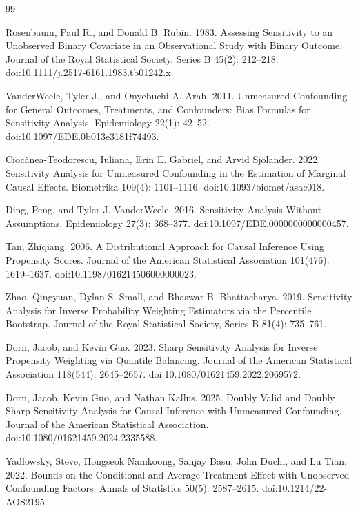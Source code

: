 \documentclass{article}
\begin{document}
\begin{thebibliography}{99}

   Rosenbaum, Paul R., and Donald B. Rubin. 1983. Assessing Sensitivity to an Unobserved Binary Covariate in an Observational Study with Binary Outcome. Journal of the Royal Statistical Society, Series B 45(2): 212--218. doi:10.1111/j.2517-6161.1983.tb01242.x.

   VanderWeele, Tyler J., and Onyebuchi A. Arah. 2011. Unmeasured Confounding for General Outcomes, Treatments, and Confounders: Bias Formulas for Sensitivity Analysis. Epidemiology 22(1): 42--52. doi:10.1097/EDE.0b013e3181f74493.

   Ciocănea-Teodorescu, Iuliana, Erin E. Gabriel, and Arvid Sjölander. 2022. Sensitivity Analysis for Unmeasured Confounding in the Estimation of Marginal Causal Effects. Biometrika 109(4): 1101--1116. doi:10.1093/biomet/asac018.

   Ding, Peng, and Tyler J. VanderWeele. 2016. Sensitivity Analysis Without Assumptions. Epidemiology 27(3): 368--377. doi:10.1097/EDE.0000000000000457.

   Tan, Zhiqiang. 2006. A Distributional Approach for Causal Inference Using Propensity Scores. Journal of the American Statistical Association 101(476): 1619--1637. doi:10.1198/016214506000000023.

   Zhao, Qingyuan, Dylan S. Small, and Bhaswar B. Bhattacharya. 2019. Sensitivity Analysis for Inverse Probability Weighting Estimators via the Percentile Bootstrap. Journal of the Royal Statistical Society, Series B 81(4): 735--761.

   Dorn, Jacob, and Kevin Guo. 2023. Sharp Sensitivity Analysis for Inverse Propensity Weighting via Quantile Balancing. Journal of the American Statistical Association 118(544): 2645--2657. doi:10.1080/01621459.2022.2069572.

   Dorn, Jacob, Kevin Guo, and Nathan Kallus. 2025. Doubly Valid and Doubly Sharp Sensitivity Analysis for Causal Inference with Unmeasured Confounding. Journal of the American Statistical Association. doi:10.1080/01621459.2024.2335588.

   Yadlowsky, Steve, Hongseok Namkoong, Sanjay Basu, John Duchi, and Lu Tian. 2022. Bounds on the Conditional and Average Treatment Effect with Unobserved Confounding Factors. Annals of Statistics 50(5): 2587--2615. doi:10.1214/22-AOS2195.


\end{thebibliography}
\end{document}
